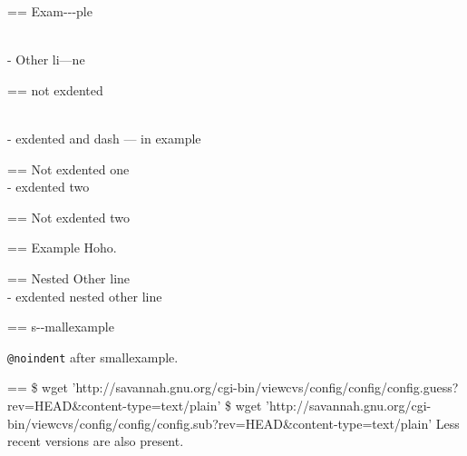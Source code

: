 \documentclass{book}
\makeatletter
\newenvironment{Texinfopreformatted}{%
  \par\GNUTobeylines\obeyspaces\frenchspacing\parskip=\z@\parindent=\z@}{}
{\catcode`\^^M=13 \gdef\GNUTobeylines{\catcode`\^^M=13 \def^^M{\null\par}}}
\newenvironment{Texinfoindented}{\begin{list}{}{}\item\relax}{\end{list}}
\renewcommand{\_}{\Texinfounderscore\discretionary{}{}{}}
\makeatother
\begin{document}
\begin{Texinfoindented}
\begin{Texinfopreformatted}%
\ttfamily Exam{-}{-}{-}ple

\end{Texinfopreformatted}
\leavevmode{}\\
\hbox{\kern -\leftmargin}%
Other li---ne
\\
\begin{Texinfopreformatted}%
\ttfamily not exdented
\end{Texinfopreformatted}
\end{Texinfoindented}

\begin{Texinfoindented}
\leavevmode{}\\
\hbox{\kern -\leftmargin}%
exdented  and dash --- in example
\\
\begin{Texinfopreformatted}%
\ttfamily Not exdented one
\end{Texinfopreformatted}
\leavevmode{}\\
\hbox{\kern -\leftmargin}%
exdented two
\\
\begin{Texinfopreformatted}%
\ttfamily Not exdented two
\end{Texinfopreformatted}
\end{Texinfoindented}

\begin{Texinfoindented}
\begin{Texinfopreformatted}%
\ttfamily Example   Hoho.
\end{Texinfopreformatted}
\begin{Texinfoindented}
\begin{Texinfopreformatted}%
\ttfamily Nested Other line
\end{Texinfopreformatted}
\leavevmode{}\\
\hbox{\kern -\leftmargin}%
exdented nested other line
\\
\end{Texinfoindented}
\end{Texinfoindented}

\begin{Texinfopreformatted}%
\ttfamily \footnotesize s{-}{-}mallexample
\end{Texinfopreformatted}

\texttt{@noindent} after smallexample.
\begin{Texinfopreformatted}%
\ttfamily \footnotesize \$ wget 'http://savannah.gnu.org/cgi-bin/viewcvs/config/config/config.guess?rev=HEAD\&content-type=text/plain'
\$ wget 'http://savannah.gnu.org/cgi-bin/viewcvs/config/config/config.sub?rev=HEAD\&content-type=text/plain'
\end{Texinfopreformatted}
\noindent{}Less recent versions are also present.
\end{document}
